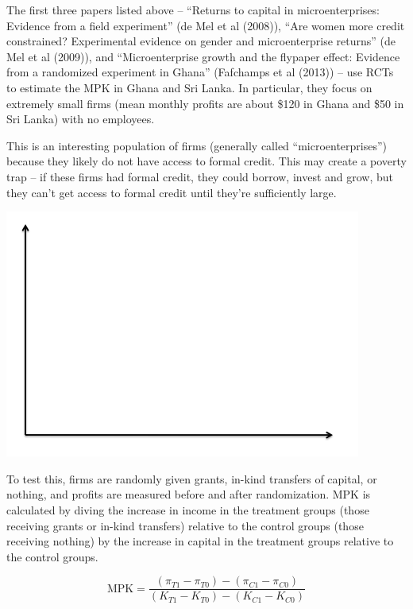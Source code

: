 \documentclass[12pt,english]{article}
\begin{document}
The first three papers listed above -- ``Returns to capital in microenterprises: Evidence from a field experiment'' (de Mel et al (2008)), ``Are women more credit constrained? Experimental evidence on gender and microenterprise returns'' (de Mel et al (2009)), and ``Microenterprise growth and the flypaper effect: Evidence from a randomized experiment in Ghana'' (Fafchamps et al (2013)) -- use RCTs to estimate the MPK in Ghana and Sri Lanka. In particular, they focus on extremely small firms (mean monthly profits are about \$120 in Ghana and \$50 in Sri Lanka) with no employees.

This is an interesting population of firms (generally called ``microenterprises'') because they likely do not have access to formal credit. This may create a poverty trap -- if these firms had formal credit, they could borrow, invest and grow, but they can't get access to formal credit until they're sufficiently large.

\begin{center}
	\begin{adjustbox}{
			max width=0.65\textwidth,
		}
		\includegraphics{axes.png}
	\end{adjustbox}
\end{center}

To test this, firms are randomly given grants, in-kind transfers of capital, or nothing, and profits are measured before and after randomization. MPK is calculated by diving the increase in income in the treatment groups (those receiving grants or in-kind transfers) relative to the control groups (those receiving nothing) by the increase in capital in the treatment groups relative to the control groups.

$$ \text{MPK} = \frac{(\pi_{T1} - \pi_{T0}) - (\pi_{C1} - \pi_{C0})}{(K_{T1} - K_{T0}) - (K_{C1} - K_{C0})} $$
\end{document}
